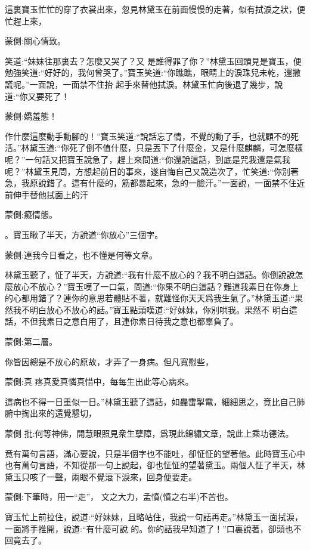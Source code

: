 \begin{parag}
    這裏寶玉忙忙的穿了衣裳出來，忽見林黛玉在前面慢慢的走著，似有拭淚之狀，便忙趕上來，\begin{note}蒙側:關心情致。\end{note}笑道:“妹妹往那裏去？怎麼又哭了？又 是誰得罪了你？”林黛玉回頭見是寶玉，便勉強笑道:“好好的，我何曾哭了。”寶玉笑道:“你瞧瞧，眼睛上的淚珠兒未乾，還撒謊呢。”一面說，一面禁不住抬 起手來替他拭淚。林黛玉忙向後退了幾步，說道:“你又要死了！\begin{note}蒙側:嬌羞態！\end{note}作什麼這麼動手動腳的！”寶玉笑道:“說話忘了情，不覺的動了手，也就顧不的死活。”林黛玉道:“你死了倒不值什麼，只是丟下了什麼金，又是什麼麒麟，可怎麼樣呢？”一句話又把寶玉說急了，趕上來問道:“你還說這話，到底是咒我還是氣我呢？”林黛玉見問，方想起前日的事來，遂自悔自己又說造次了，忙笑道:“你別著急，我原說錯了。這有什麼的，筋都暴起來，急的一臉汗。”一面說，一面禁不住近前伸手替他拭面上的汗\begin{note}蒙側:癡情態。\end{note}。寶玉瞅了半天，方說道“你放心”三個字。\begin{note}蒙側:連我今日看之，也不懂是何等文章。\end{note}林黛玉聽了，怔了半天，方說道:“我有什麼不放心的？我不明白這話。你倒說說怎麼放心不放心？”寶玉嘆了一口氣，問道:“你果不明白這話？難道我素日在你身上的心都用錯了？連你的意思若體貼不著，就難怪你天天爲我生氣了。”林黛玉道:“果然我不明白放心不放心的話。”寶玉點頭嘆道:“好妹妹，你別哄我。果然不 明白這話，不但我素日之意白用了，且連你素日待我之意也都辜負了。\begin{note}蒙側:第二層。\end{note}你皆因總是不放心的原故，才弄了一身病。但凡寬慰些，\begin{note}蒙側:真 疼真愛真憐真惜中，每每生出此等心病來。\end{note}這病也不得一日重似一日。”林黛玉聽了這話，如轟雷掣電，細細思之，竟比自己肺腑中掏出來的還覺懇切，\begin{note}蒙側 批:何等神佛，開慧眼照見衆生孽障，爲現此錦繡文章，說此上乘功德法。\end{note}竟有萬句言語，滿心要說，只是半個字也不能吐，卻怔怔的望著他。此時寶玉心中也有萬句言語，不知從那一句上說起，卻也怔怔的望著黛玉。兩個人怔了半天，林黛玉只咳了一聲，兩眼不覺滾下淚來，回身便要走。\begin{note}蒙側:下筆時，用一“走”， 文之大力，孟憤(憤之右半)不苦也。\end{note}寶玉忙上前拉住，說道:“好妹妹，且略站住，我說一句話再走。”林黛玉一面拭淚，一面將手推開，說道:“有什麼可說 的。你的話我早知道了！”口裏說著，卻頭也不回竟去了。
\end{parag}


